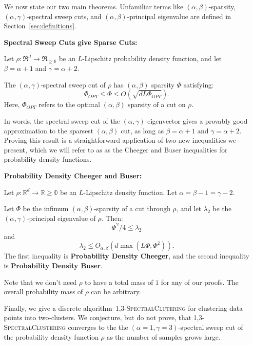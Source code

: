 We now state our two main theorems. Unfamiliar terms like 
$(\alpha, \beta)$-sparsity, $(\alpha, \gamma)$-spectral sweep cuts, and
$(\alpha,\beta)$-principal eigenvalue are defined in Section~\ref{sec:definitions}.
\begin{theorem} \label{thm:sweep-cut} 
  \textbf{Spectral Sweep Cuts give Sparse Cuts:}

  Let $\rho:\Re^d \to \Re_{\geq 0}$ be an $L$-Lipschitz probability
  density function, and let $\beta = \alpha+1$ and $\gamma = \alpha+2$.
  
  The $(\alpha,\gamma)$-spectral sweep cut of $\rho$ has 
  $(\alpha, \beta)$ sparsity $\Phi$ satisfying:
  \[ 
  \Phi_{OPT} \leq \Phi \leq O(\sqrt{dL\Phi_{OPT}} ).
  \]
  Here, $\Phi_{OPT}$ refers to the optimal $(\alpha,\beta)$ sparsity of
  a cut on $\rho$. 
\end{theorem}

In words, the spectral sweep cut of the
  $(\alpha, \gamma)$  eigenvector gives a provably good approximation to
  the sparsest $(\alpha, \beta)$ cut, as long as $\beta = \alpha+1$ and
  $\gamma = \alpha+2$.  
  Proving this result is a straightforward application of two new
  inequalities we present, which we will refer to as as the Cheeger and Buser inequalities
  for probability density functions.

\begin{theorem}\label{thm:Cheeger-Buser}
  \textbf{Probability Density Cheeger and Buser:}

  Let $\rho:\mathbb{R}^d \rightarrow \mathbb{R \geq 0}$ be an $L$-Lipschitz
  density function. Let $\alpha = \beta - 1 = \gamma - 2$.

  Let $\Phi$ be the infimum $(\alpha,\beta)$-sparsity of a cut through
  $\rho$, and let $\lambda_2$ be the $(\alpha,\gamma)$-principal eigenvalue of
  $\rho$. Then:
  \[ \Phi^2/4 \leq \lambda_2 \]
  and 
  \[\lambda _2 \leq O_{\alpha, \beta}(d \max(L \Phi, \Phi^2)).\]
  The first inequality is \textbf{Probability Density Cheeger}, and
  the second inequality is \textbf{Probability Density Buser}.
\end{theorem}
Note that we don't need $\rho$ to have a total mass of $1$ for any
of our proofs. The overall probability mass of $\rho$ can be arbitrary.

Finally, we give a discrete algorithm~\textsc{1,3-SpectralClutering} for clustering data points into
two-clusters.
We conjecture, but do not prove, that
\textsc{1,3-SpectralClustering} converges to the the $(\alpha=1,
\gamma=3)$-spectral sweep cut of the probability density function $\rho$
as the number of samples grows large.

